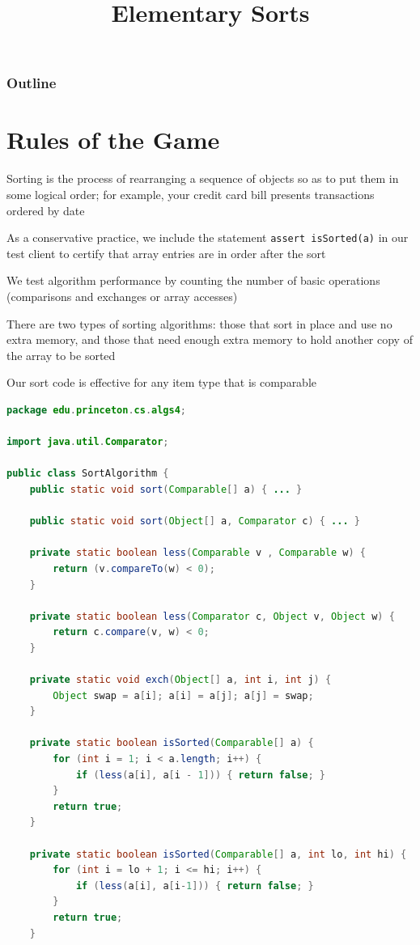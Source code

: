 \documentclass[8pt,a4paper,compress]{beamer}
\title{Elementary Sorts}
\date{}
\begin{document}
\begin{frame}
\vfill
\titlepage
\end{frame}

\begin{frame}
\frametitle{Outline}
\tableofcontents
\end{frame}

\section{Rules of the Game}
\begin{frame}[fragile]
Sorting is the process of rearranging a sequence of objects so as to put them in some logical order; for example, your credit card bill presents transactions ordered by date

\bigskip

As a conservative practice, we include the statement \lstinline{assert isSorted(a)} in our test client to certify that array entries are in order after the sort

\bigskip

We test algorithm performance by counting the number of basic
operations (comparisons and exchanges or array accesses)

\bigskip

There are two types of sorting algorithms: those that sort in place and use no extra memory, and those that need enough extra memory to hold another copy of the array to be sorted

\bigskip

Our sort code is effective for any item type that is comparable
\end{frame}

\begin{frame}[fragile]
\begin{lstlisting}[language=Java]
package edu.princeton.cs.algs4;

import java.util.Comparator;

public class SortAlgorithm {
    public static void sort(Comparable[] a) { ... }
    
    public static void sort(Object[] a, Comparator c) { ... }

    private static boolean less(Comparable v , Comparable w) {
        return (v.compareTo(w) < 0);
    }

    private static boolean less(Comparator c, Object v, Object w) {
        return c.compare(v, w) < 0;
    }
        
    private static void exch(Object[] a, int i, int j) {
        Object swap = a[i]; a[i] = a[j]; a[j] = swap;
    }
    
    private static boolean isSorted(Comparable[] a) {
        for (int i = 1; i < a.length; i++) {
            if (less(a[i], a[i - 1])) { return false; }
        }
        return true;
    }

    private static boolean isSorted(Comparable[] a, int lo, int hi) {
        for (int i = lo + 1; i <= hi; i++) {
            if (less(a[i], a[i-1])) { return false; }
        }
        return true;
    }
\end{lstlisting}
\end{frame}
\end{document}
